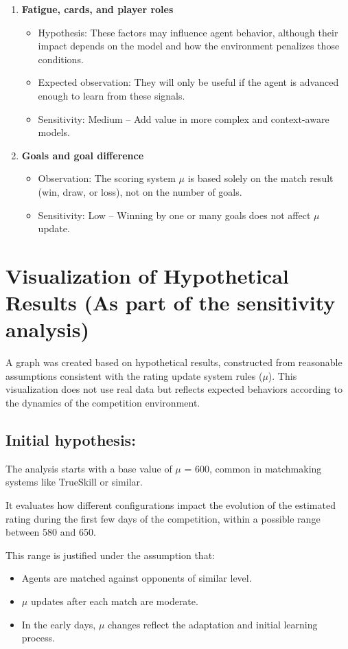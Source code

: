 \begin{enumerate}
    \item \textbf{Fatigue, cards, and player roles}
    \begin{itemize}
        \item Hypothesis: These factors may influence agent behavior, although their impact depends on the model and how the environment penalizes those conditions.
        \item Expected observation: They will only be useful if the agent is advanced enough to learn from these signals.
        \item Sensitivity: Medium – Add value in more complex and context-aware models.
    \end{itemize}

    \item \textbf{Goals and goal difference}
    \begin{itemize}
        \item Observation: The scoring system $\mu$ is based solely on the match result (win, draw, or loss), not on the number of goals.
        \item Sensitivity: Low – Winning by one or many goals does not affect $\mu$ update.
    \end{itemize}
\end{enumerate}

\section*{Visualization of Hypothetical Results (As part of the sensitivity analysis)}

A graph was created based on hypothetical results, constructed from reasonable assumptions consistent with the rating update system rules ($\mu$). This visualization does not use real data but reflects expected behaviors according to the dynamics of the competition environment.

\subsection*{Initial hypothesis:}
The analysis starts with a base value of $\mu$ = 600, common in matchmaking systems like TrueSkill or similar.

It evaluates how different configurations impact the evolution of the estimated rating during the first few days of the competition, within a possible range between 580 and 650.

This range is justified under the assumption that:
\begin{itemize}
    \item Agents are matched against opponents of similar level.
    \item $\mu$ updates after each match are moderate.
    \item In the early days, $\mu$ changes reflect the adaptation and initial learning process.
\end{itemize}

